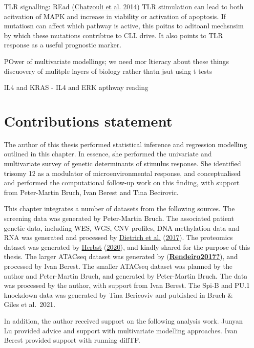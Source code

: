 \documentclass[11pt, a4paper, twosided]{book}
\begin{document}
TLR signalling:
REad (\protect\hyperlink{ref-Chatzouli2014}{Chatzouli et al. 2014})
TLR stimulation can lead to both acitvation of MAPK and increase in viability or activation of apoptosis. If mutatiosn can affect which pathway is active, this poitns to aditoanl mechsnsim by which these mutations contribtue to CLL drive. It also points to TLR response as a useful prognostic marker.

POwer of multivariate modellings;
we need mor ltieracy about these things
discuovery of mulitple layers of biology rather thatn jsut using t tests

IL4 and KRAS - IL4 and ERK apthway reading

\hypertarget{contributions-statement-1}{%
\section{Contributions statement}\label{contributions-statement-1}}

The author of this thesis performed statistical inference and regression modelling outlined in this chapter. In essence, she performed the univariate and multivariate survey of genetic determinants of stimulus response. She identified trisomy 12 as a modulator of microenvironmental response, and conceptualised and performed the computational follow-up work on this finding, with support from Peter-Martin Bruch, Ivan Berest and Tina Becirovic.

This chapter integrates a number of datasets from the following sources. The screening data was generated by Peter-Martin Bruch. The associated patient genetic data, including WES, WGS, CNV profiles, DNA methylation data and RNA was generated and processed by \protect\hyperlink{ref-JCIpaper}{Dietrich et al.} (\protect\hyperlink{ref-JCIpaper}{2017}). The proteomics dataset was generated by \protect\hyperlink{ref-HerbstThesis}{Herbst} (\protect\hyperlink{ref-HerbstThesis}{2020}), and kindly shared for the purpose of this thesis. The larger ATACseq dataset was generated by (\protect\hyperlink{ref-Rendeiro2017}{\textbf{Rendeiro2017?}}), and processed by Ivan Berest. The smaller ATACseq dataset was planned by the author and Peter-Martin Bruch, and generated by Peter-Martin Bruch. The data was processed by the author, with support from Ivan Berest. The Spi-B and PU.1 knockdown data was generated by Tina Bericoviv and published in Bruch \& Giles et al.~2021.

In addition, the author received support on the following analysis work. Junyan Lu provided advice and support with multivariate modelling approaches. Ivan Berest provided support with running diffTF.
\end{document}
